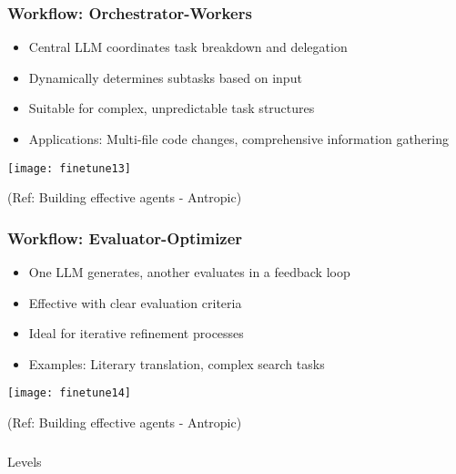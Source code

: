 \begin{frame}[fragile]\frametitle{Workflow: Orchestrator-Workers}
    \begin{itemize}
        \item Central LLM coordinates task breakdown and delegation
        \item Dynamically determines subtasks based on input
        \item Suitable for complex, unpredictable task structures
        \item Applications: Multi-file code changes, comprehensive information gathering
    \end{itemize}
	
	\begin{center}
	\texttt{[image: finetune13]}
	\end{center}

	{\tiny (Ref: Building effective agents - Antropic)}			
\end{frame}

\begin{frame}[fragile]\frametitle{Workflow: Evaluator-Optimizer}
    \begin{itemize}
        \item One LLM generates, another evaluates in a feedback loop
        \item Effective with clear evaluation criteria
        \item Ideal for iterative refinement processes
        \item Examples: Literary translation, complex search tasks
    \end{itemize}
	
	\begin{center}
	\texttt{[image: finetune14]}
	\end{center}

	{\tiny (Ref: Building effective agents - Antropic)}		
\end{frame}

\begin{frame}[fragile]\frametitle{}
\begin{center}
{\Large Levels}
\end{center}
\end{frame}

